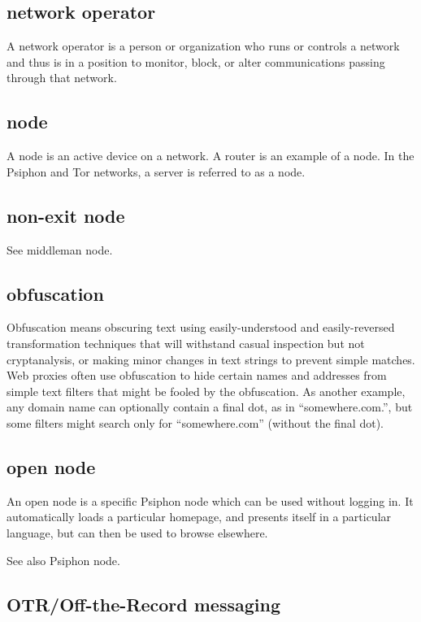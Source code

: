 \subsection{network operator}

A network operator is a person or organization who runs or controls a
network and thus is in a position to monitor, block, or alter
communications passing through that network.

\subsection{node}

A node is an active device on a network. A router is an example of a
node. In the Psiphon and Tor networks, a server is referred to as a
node.

\subsection{non-exit node}

See middleman node.

\subsection{obfuscation}

Obfuscation means obscuring text using easily-understood and
easily-reversed transformation techniques that will withstand casual
inspection but not cryptanalysis, or making minor changes in text
strings to prevent simple matches. Web proxies often use obfuscation to
hide certain names and addresses from simple text filters that might be
fooled by the obfuscation. As another example, any domain name can
optionally contain a final dot, as in ``somewhere.com.'', but some
filters might search only for ``somewhere.com'' (without the final dot).

\subsection{open node}

An open node is a specific Psiphon node which can be used without
logging in. It automatically loads a particular homepage, and presents
itself in a particular language, but can then be used to browse
elsewhere.

See also Psiphon node.

\subsection{OTR/Off-the-Record messaging}

